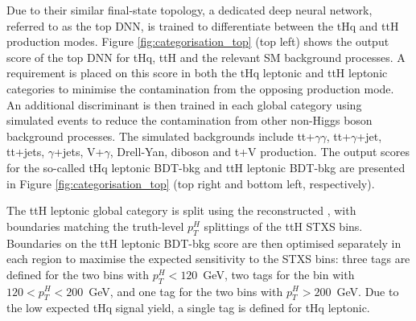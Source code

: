 Due to their similar final-state topology, a dedicated deep neural network, referred to as the top DNN, is trained to differentiate between the tHq and ttH production modes. Figure \ref{fig:categorisation_top} (top left) shows the output score of the top DNN for tHq, ttH and the relevant SM background processes. A requirement is placed on this score in both the tHq leptonic and ttH leptonic categories to minimise the contamination from the opposing production mode. An additional discriminant is then trained in each global category using simulated events to reduce the contamination from other non-Higgs boson background processes. The simulated backgrounds include tt+$\gamma\gamma$, tt+$\gamma$+jet, tt+jets, $\gamma$+jets, V+$\gamma$, Drell-Yan, diboson and t+V production. The output scores for the so-called tHq leptonic BDT-bkg and ttH leptonic BDT-bkg are presented in Figure \ref{fig:categorisation_top} (top right and bottom left, respectively). 

The ttH leptonic global category is split using the reconstructed \ptgg, with boundaries matching the truth-level $p_T^H$ splittings of the ttH STXS bins. Boundaries on the ttH leptonic BDT-bkg score are then optimised separately in each region to maximise the expected sensitivity to the STXS bins: three tags are defined for the two bins with $p_T^H<120$~GeV, two tags for the bin with $120<p_T^H<200$~GeV, and one tag for the two bins with $p_T^H>200$~GeV. Due to the low expected tHq signal yield, a single tag is defined for tHq leptonic.

